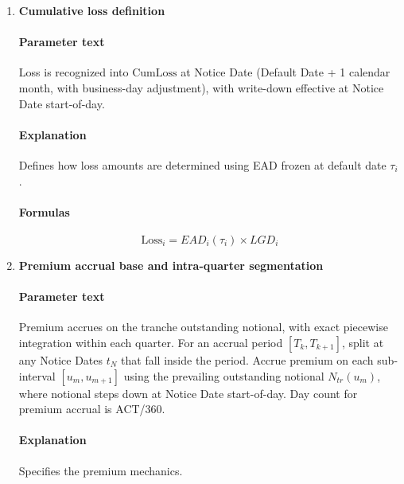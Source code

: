 \documentclass[11pt]{article}
\begin{document}
\begin{enumerate}[label=\arabic*),leftmargin=*,align=left]
\paragraph{Explanation} Defines scheduled pool balance relationships.
\paragraph{Formulas}
\begin{align*}
\alpha &= \frac{N_{\text{sched}}(0)}{\text{PoolBal}_{\text{sched}}(0)} \\
N_{\text{sched}}(t) &= \alpha \times \text{PoolBal}_{\text{sched}}(t)
\end{align*}

\item \textbf{Cumulative loss definition}
\paragraph{Parameter text} Loss is recognized into $\text{CumLoss}$ at Notice Date (Default Date + 1 calendar month, with business-day adjustment), with write-down effective at Notice Date start-of-day. 
\paragraph{Explanation} Defines how loss amounts are determined using EAD frozen at default date $\tau_i$.
\paragraph{Formulas}
\[ \text{Loss}_i = EAD_i(\tau_i) \times LGD_i \]

\item \textbf{Premium accrual base and intra-quarter segmentation}
\paragraph{Parameter text} Premium accrues on the tranche outstanding notional, with exact piecewise integration within each quarter. For an accrual period $[T_k, T_{k+1}]$, split at any Notice Dates $t_N$ that fall inside the period. Accrue premium on each sub-interval $[u_m, u_{m+1}]$ using the prevailing outstanding notional $N_{tr}(u_m)$, where notional steps down at Notice Date start-of-day. Day count for premium accrual is ACT/360.
\paragraph{Explanation} Specifies the premium mechanics.


\end{enumerate}
\end{document}
